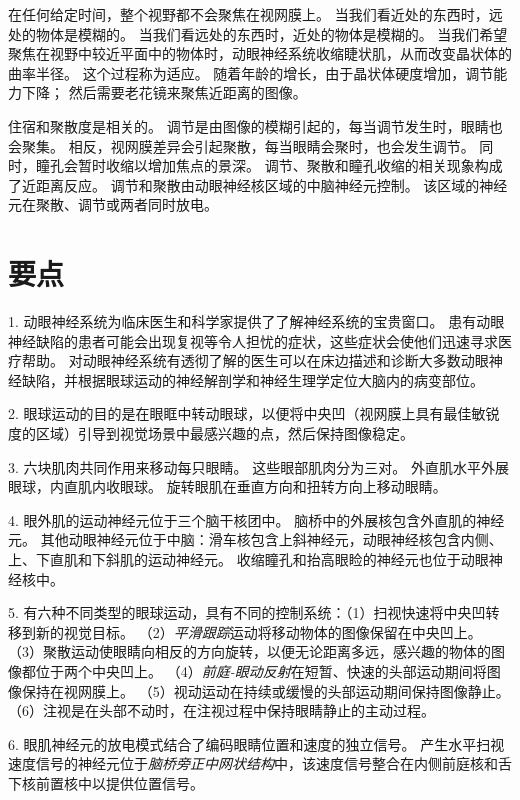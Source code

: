 在任何给定时间，整个视野都不会聚焦在视网膜上。
当我们看近处的东西时，远处的物体是模糊的。
当我们看远处的东西时，近处的物体是模糊的。
当我们希望聚焦在视野中较近平面中的物体时，动眼神经系统收缩睫状肌，从而改变晶状体的曲率半径。
这个过程称为适应。
随着年龄的增长，由于晶状体硬度增加，调节能力下降； 然后需要老花镜来聚焦近距离的图像。


住宿和聚散度是相关的。
调节是由图像的模糊引起的，每当调节发生时，眼睛也会聚集。
相反，视网膜差异会引起聚散，每当眼睛会聚时，也会发生调节。
同时，瞳孔会暂时收缩以增加焦点的景深。
调节、聚散和瞳孔收缩的相关现象构成了近距离反应。
调节和聚散由动眼神经核区域的中脑神经元控制。
该区域的神经元在聚散、调节或两者同时放电。



\section{要点}

1. 动眼神经系统为临床医生和科学家提供了了解神经系统的宝贵窗口。
患有动眼神经缺陷的患者可能会出现复视等令人担忧的症状，这些症状会使他们迅速寻求医疗帮助。
对动眼神经系统有透彻了解的医生可以在床边描述和诊断大多数动眼神经缺陷，并根据眼球运动的神经解剖学和神经生理学定位大脑内的病变部位。


2. 眼球运动的目的是在眼眶中转动眼球，以便将中央凹（视网膜上具有最佳敏锐度的区域）引导到视觉场景中最感兴趣的点，然后保持图像稳定。


3. 六块肌肉共同作用来移动每只眼睛。
这些眼部肌肉分为三对。
外直肌水平外展眼球，内直肌内收眼球。
旋转眼肌在垂直方向和扭转方向上移动眼睛。


4. 眼外肌的运动神经元位于三个脑干核团中。
脑桥中的外展核包含外直肌的神经元。
其他动眼神经元位于中脑：滑车核包含上斜神经元，动眼神经核包含内侧、上、下直肌和下斜肌的运动神经元。
收缩瞳孔和抬高眼睑的神经元也位于动眼神经核中。


5. 有六种不同类型的眼球运动，具有不同的控制系统：（1）扫视快速将中央凹转移到新的视觉目标。
（2）\textit{平滑跟踪}运动将移动物体的图像保留在中央凹上。
（3）聚散运动使眼睛向相反的方向旋转，以便无论距离多远，感兴趣的物体的图像都位于两个中央凹上。
（4）\textit{前庭-眼动反射}在短暂、快速的头部运动期间将图像保持在视网膜上。
（5）视动运动在持续或缓慢的头部运动期间保持图像静止。
（6）注视是在头部不动时，在注视过程中保持眼睛静止的主动过程。


6. 眼肌神经元的放电模式结合了编码眼睛位置和速度的独立信号。
产生水平扫视速度信号的神经元位于\textit{脑桥旁正中网状结构}中，该速度信号整合在内侧前庭核和舌下核前置核中以提供位置信号。


